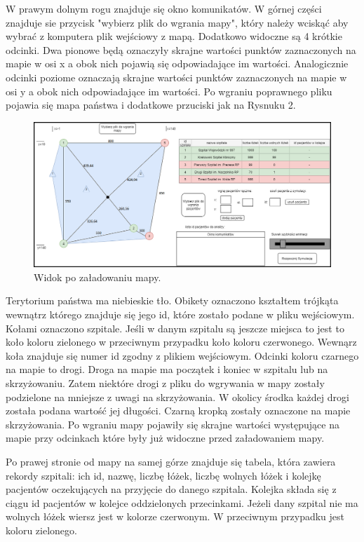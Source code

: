 \documentclass[10pt,a4paper]{article}
\begin{document}
W prawym dolnym rogu znajduje się okno komunikatów. W górnej części znajduje sie przycisk "wybierz plik do wgrania mapy", który należy wciskąć aby wybrać z komputera plik wejściowy z mapą. Dodatkowo widoczne są 4 krótkie odcinki. Dwa pionowe będą oznaczyły skrajne wartości punktów zaznaczonych na mapie w osi x a obok nich pojawią się odpowiadające im wartości. Analogicznie odcinki poziome oznaczają skrajne wartości punktów zaznaczonych na mapie w osi y a obok nich odpowiadające im wartości. Po wgraniu poprawnego pliku pojawia się mapa państwa i dodatkowe przuciski jak na Rysnuku 2.

\begin{figure}[h]
  \includegraphics[width=\linewidth]{./images/widok_z_mapa.png}
  \caption{Widok po załadowaniu mapy.}
  \label{fig:GUImap}
\end{figure}

Terytorium państwa ma niebieskie tło. Obikety oznaczono kształtem trójkąta wewnątrz którego znajduje się jego id, które zostało podane w pliku wejściowym. Kołami oznaczono szpitale. Jeśli w danym szpitalu są jeszcze miejsca to jest to koło koloru zielonego w przeciwnym przypadku koło koloru czerwonego. Wewnąrz koła znajduje się numer id zgodny z plikiem wejściowym. Odcinki koloru czarnego na mapie to drogi. Droga na mapie ma początek i koniec w szpitalu lub na skrzyżowaniu. Zatem niektóre drogi z pliku do wgrywania w mapy zostały podzielone na mniejsze z uwagi na skrzyżowania. W okolicy środka każdej drogi została podana wartość jej długości. Czarną kropką zostały oznaczone na mapie skrzyżowania. Po wgraniu mapy pojawiły się skrajne wartości występujące na mapie przy odcinkach które były już widoczne przed załadowaniem mapy.

Po prawej stronie od mapy na samej górze znajduje się tabela, która zawiera rekordy szpitali: ich id, nazwę, liczbę łóżek, liczbę wolnych łóżek i kolejkę pacjentów oczekujących na przyjęcie do danego szpitala. Kolejka składa się z ciągu id pacjentów w kolejce oddzielonych przecinkami. Jeżeli dany szpital nie ma wolnych łóżek wiersz jest w kolorze czerwonym. W przeciwnym przypadku jest koloru zielonego.
\end{document}
